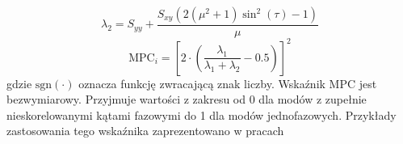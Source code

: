 \begin{equation}
\lambda_{2}=S_{yy}+\frac{S_{xy}(2(\mu^{2}+1)\sin^{2}{(\tau)}-1)}{\mu}
\end{equation}
\begin{equation} \label{eq:mpc_ratio}
\mathrm{MPC}_{i}=\left[2\cdot\left(\frac{\lambda_{1}}{\lambda_{1}+\lambda_{2}}-0.5\right)\right]^{2}
\end{equation}
gdzie $\mathrm{sgn}(\cdot)$ oznacza funkcję zwracającą znak liczby. Wskaźnik MPC jest bezwymiarowy. Przyjmuje wartości z zakresu od 0 dla modów z zupełnie nieskorelowanymi kątami fazowymi do 1 dla modów jednofazowych. Przykłady zastosowania tego wskaźnika zaprezentowano w pracach 
\printbibliography


